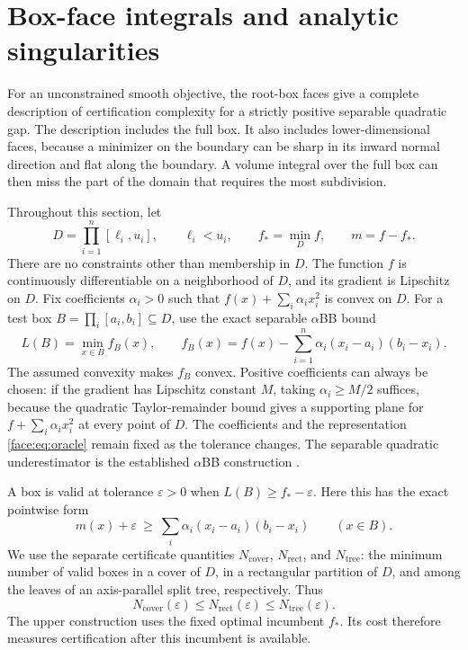\section{Box-face integrals and analytic singularities}
\label{sec:face-exact}

For an unconstrained smooth objective, the root-box faces give a complete
description of certification complexity for a strictly positive separable
quadratic gap.  The description includes the full box.  It also includes
lower-dimensional faces, because a minimizer on the boundary can be sharp
in its inward normal direction and flat along the boundary.  A volume
integral over the full box can then miss the part of the domain that
requires the most subdivision.

Throughout this section, let
\[
 D=\prod_{i=1}^n[\ell_i,u_i],\qquad \ell_i<u_i,
 \qquad f_*=\min_D f,\qquad m=f-f_*.
\]
There are no constraints other than membership in $D$.  The function $f$
is continuously differentiable on a neighborhood of $D$, and its gradient
is Lipschitz on $D$.  Fix coefficients $\alpha_i>0$ such that
$f(x)+\sum_i\alpha_i x_i^2$ is convex on $D$.  For a test box
$B=\prod_i[a_i,b_i]\subseteq D$, use the exact separable $\alpha$BB bound
\begin{equation}
 \label{face:eq:oracle}
 L(B)=\min_{x\in B} f_B(x),\qquad
 f_B(x)=f(x)-\sum_{i=1}^n\alpha_i(x_i-a_i)(b_i-x_i).
\end{equation}
The assumed convexity makes $f_B$ convex.  Positive coefficients can
always be chosen: if the gradient has Lipschitz constant $M$, taking
$\alpha_i\ge M/2$ suffices, because the quadratic Taylor-remainder
bound gives a supporting plane for $f+\sum_i\alpha_i x_i^2$ at every
point of $D$.  The coefficients and the representation
\eqref{face:eq:oracle} remain fixed as the tolerance changes.
The separable quadratic underestimator is the established $\alpha$BB
construction \citep{adjimanDallwigFloudasNeumaier1998AlphaBBTheory}.

A box is valid at tolerance $\varepsilon>0$ when
$L(B)\ge f_*-\varepsilon$.  Here this has the exact pointwise form
\begin{equation}
 \label{face:eq:validity}
 m(x)+\varepsilon\ \ge\
 \sum_i\alpha_i(x_i-a_i)(b_i-x_i)
 \qquad(x\in B).
\end{equation}
We use the separate certificate quantities $N_{\mathrm{cover}}$,
$N_{\mathrm{rect}}$, and $N_{\mathrm{tree}}$: the minimum number of valid
boxes in a cover of $D$, in a rectangular partition of $D$, and among
the leaves of an axis-parallel split tree, respectively.  Thus
\begin{equation}
 \label{face:eq:benchmarks}
 N_{\mathrm{cover}}(\varepsilon)
 \le N_{\mathrm{rect}}(\varepsilon)
 \le N_{\mathrm{tree}}(\varepsilon).
\end{equation}
The upper construction uses the fixed optimal incumbent $f_*$.  Its cost
therefore measures certification after this incumbent is available.

